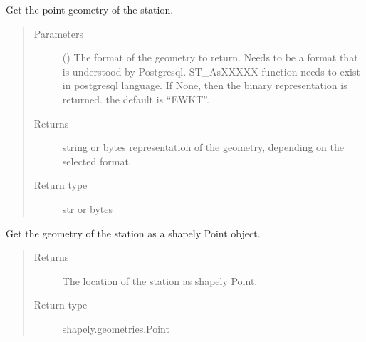 \documentclass[letterpaper,10pt,english]{sphinxmanual}
\begin{document}
\begin{fulllineitems}
\begin{fulllineitems}
\label{\detokenize{weatherDB:weatherDB.station.StationBase.get_geom}}
\sphinxAtStartPar
Get the point geometry of the station.
\begin{quote}\begin{description}
\item[{Parameters}] \leavevmode
\sphinxAtStartPar
{} (\sphinxstyleliteralemphasis{\sphinxupquote{, }}) \textendash{} The format of the geometry to return.
Needs to be a format that is understood by Postgresql.
ST\_AsXXXXX function needs to exist in postgresql language.
If None, then the binary representation is returned.
the default is “EWKT”.

\item[{Returns}] \leavevmode
\sphinxAtStartPar
string or bytes representation of the geometry,
depending on the selected format.

\item[{Return type}] \leavevmode
\sphinxAtStartPar
str or bytes

\end{description}\end{quote}

\end{fulllineitems}


\begin{fulllineitems}
\label{\detokenize{weatherDB:weatherDB.station.StationBase.get_geom_shp}}
\sphinxAtStartPar
Get the geometry of the station as a shapely Point object.
\begin{quote}\begin{description}
\item[{Returns}] \leavevmode
\sphinxAtStartPar
The location of the station as shapely Point.

\item[{Return type}] \leavevmode
\sphinxAtStartPar
shapely.geometries.Point


\end{description}
\end{quote}
\end{fulllineitems}
\end{fulllineitems}
\end{document}
